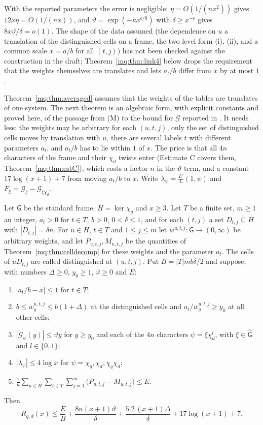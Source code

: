 With the reported parameters the error is negligible: $\eta=O(1/(nx^2))$ gives $12x\eta=O(1/(nx))$, and $\vartheta=\exp(-\kappa x^{\epsilon/8})$ with $\delta\ge x^{-\epsilon}$ gives $8x\vartheta/\delta=o(1)$. The shape of the data assumed (the dependence on $u$ a translation of the distinguished cells on a frame, the two level form (i), (ii), and a common scale $x=a/b$ for all $(t,j)$) has not been checked against the construction in the draft; Theorem~\ref{mq:thm:link4} below drops the requirement that the weights themselves are translates and lets $a_t/b$ differ from $x$ by at most $1$.

Theorem~\ref{mq:thm:averaged} assumes that the weights of the tables are translates of one system. The next theorem is an algebraic form, with explicit constants and proved here, of the passage from (M) to the bound for $\mathcal G$ reported in \cite{Rub26}. It needs less: the weights may be arbitrary for each $(u,t,j)$, only the set of distinguished cells moves by translation with $u$, there are several labels $t$ with different parameters $a_t$, and $a_t/b$ has to lie within $1$ of $x$. The price is that all $4n$ characters of the frame and their $\chi_d$ twists enter (Estimate C covers them, Theorem~\ref{mq:thm:estC}), which costs a factor $n$ in the $\vartheta$ term, and a constant $17\log(x+1)+7$ from moving $a_t/b$ to $x$. Write $\lambda_\psi=\frac{L'}{L}(1,\psi)$ and $F_\xi=\mathcal G_\xi-\mathcal G_{\xi\chi_d}$.

\begin{theorem}\label{mq:thm:link4}
Let $\mathsf G$ be the standard frame, $H=\ker\chi_q$ and $x\ge3$. Let $T$ be a finite set, $m\ge1$ an integer, $a_t>0$ for $t\in T$, $b>0$, $0<\delta\le1$, and for each $(t,j)$ a set $D_{t,j}\subseteq H$ with $|D_{t,j}|=\delta n$. For $u\in H$, $t\in T$ and $1\le j\le m$ let $w^{u,t,j}:\mathsf G\to(0,\infty)$ be arbitrary weights, and let $P_{u,t,j},M_{u,t,j}$ be the quantities of Theorem~\ref{mq:thm:celldecomp} for these weights and the parameter $a_t$. The cells of $uD_{t,j}$ are called distinguished at $(u,t,j)$. Put $B=|T|mb\delta/2$ and suppose, with numbers $\Delta\ge0$, $y_0\ge1$, $\vartheta\ge0$ and $E$:
\begin{enumerate}
\item[(a)] $|a_t/b-x|\le1$ for $t\in T$;
\item[(b)] $b\le w^{u,t,j}_g\le b(1+\Delta)$ at the distinguished cells and $a_t/w^{u,t,j}_g\ge y_0$ at all other cells;
\item[(c)] $|\mathcal G_\psi(y)|\le\vartheta y$ for $y\ge y_0$ and each of the $4n$ characters $\psi=\xi\chi_d^l$, with $\xi\in\widehat{\mathsf G}$ and $l\in\{0,1\}$;
\item[(d)] $|\lambda_\psi|\le4\log x$ for $\psi=\chi_q,\chi_d,\chi_q\chi_d$;
\item[(M$'$)] $\displaystyle\frac1n\sum_{u\in H}\sum_{t\in T}\sum_{j=1}^m\big(P_{u,t,j}-M_{u,t,j}\big)\le E$.
\end{enumerate}
Then
\[
R_{q,d}(x)\le\frac EB+\frac{8n(x+1)\vartheta}{\delta}+\frac{5.2\,(x+1)\Delta}{\delta}+17\log(x+1)+7 .
\]
\end{theorem}

